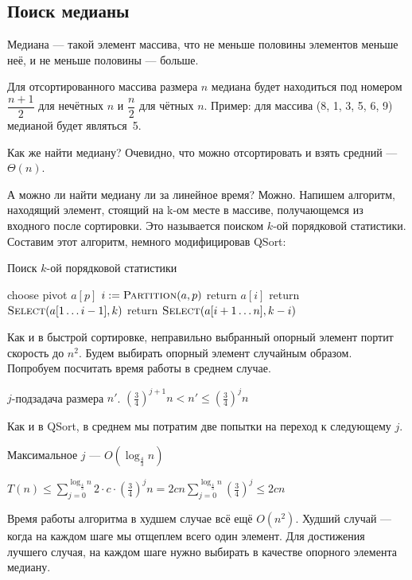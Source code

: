 \documentclass[a4paper,12pt]{article}
\begin{document}
\subsection{Поиск медианы}

Медиана --- такой элемент массива, что не меньше половины элементов меньше неё, и не меньше половины --- больше.

Для отсортированного массива размера $n$ медиана будет  находиться под номером $\dfrac{n + 1}{2}$ для нечётных $n$ и $\dfrac{n}{2}$ для чётных $n$.
Пример: для массива (8, 1, 3, 5, 6, 9) медианой будет являться~5.

Как же найти медиану?
Очевидно, что можно отсортировать и взять средний --- $\Theta(n)$.

А можно ли найти медиану ли за линейное время?
Можно.
Напишем алгоритм, находящий элемент, стоящий на k-ом месте в массиве, получающемся из входного после сортировки.
Это называется поиском $k$-ой порядковой статистики.
Составим этот алгоритм, немного модифицировав QSort:

\begin{algorithm}
\caption{Поиск $k$-ой порядковой статистики}
\begin{algorithmic}[1]
	\State choose pivot $a[p]$
	\State $i \mathrel{:=} \textsc{Partition}(a, p)$
		\State return $a[i]$	
	\EndIf
		\State return $\textsc{Select}(a[1 \ldots i - 1], k)$
	\Else
		\State return $\textsc{Select}(a[i + 1 \ldots n], k - i)$
	\EndIf
\EndFunction
\end{algorithmic}
\end{algorithm}

Как и в быстрой сортировке, неправильно выбранный опорный элемент портит скорость до $n^2$. Будем выбирать опорный элемент случайным образом. Попробуем посчитать время работы в среднем случае.

$j$-подзадача размера $n'$. $\left( \frac{3}{4} \right)^{j+1}n < n' \leqslant \left( \frac{3}{4} \right)^{j}n$

Как и в QSort, в среднем мы потратим две попытки на переход к следующему $j$.

Максимальное $j$ --- $O(\log_\frac{4}{3} n)$

$T(n) \leqslant \sum\limits_{j=0}^{\log_{\frac{4}{3}}n} 2\cdot c\cdot \left( \frac{3}{4} \right)^jn = 2cn\sum\limits_{j=0}^{\log_{\frac{4}{3}}n}\left( \frac{3}{4} \right)^j \leqslant 2cn$

Время работы алгоритма в худшем случае всё ещё $O(n^2)$.
Худший случай — когда на каждом шаге мы отщеплем всего один элемент.
Для достижения лучшего случая, на каждом шаге нужно выбирать в качестве опорного элемента медиану.
\end{document}
